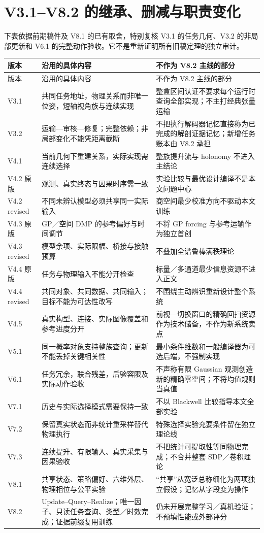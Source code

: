 \documentclass[UTF8,11pt,a4paper,fontset=fandol]{ctexart}
\numberwithin{equation}{section}
\theoremstyle{definition}
\begin{document}
\section{V3.1--V8.2 的继承、删减与职责变化}
\label{app:versions}
下表依据前期稿件及 V8.1 的已有取舍，特别复核 V3.1 的任务几何、V3.2 的非局部更新和 V6.1 的完整动作验收。它不是重新证明所有旧稿定理的独立审计。
\begin{longtable}{P{25mm}P{65mm}P{58mm}}
\toprule
版本 & 沿用的具体内容 & 不作为 V8.2 主线的部分\\\midrule\endfirsthead
\toprule 版本 & 沿用的具体内容 & 不作为 V8.2 主线的部分\\\midrule\endhead
V3.1 & 共同任务地址，物理关系而非唯一位姿，短轴视角族与连续实现 & 整盒区间认证不要求每个运行时查询全部实现；不主打经典张量运输\\
V3.2 & 运输—审核—修复；完整依赖；非局部变化不能凭距离截断 & 不把执行解码器记忆直接称为已完成的解剖证据记忆；新增任务账本由 V8.2 承担\\
V4.1 & 当前几何下重建关系，实际实现需连续选择 & 整族提升流与 holonomy 不进入主结论\\
V4.2 原版 & 观测、真实终态与因果时序需一致 & 实验比较与最优设计编译不是本文问题中心\\
V4.2 revised & 不同未辨认模型必须共享同一实际输入 & 商空间最少校准方向不驱动本文训练\\
V4.3 原版 & GP／空间 DMP 的参考偏好与时间调节 & 不将 GP forcing 与参考运输作为独立首创\\
V4.3 revised & 模型余项、实际限幅、桥接与接触预算 & 不叠加全谱鲁棒满秩理论\\
V4.4 原版 & 任务与物理输入不能分开检查 & 标量／多通道最少信息资源不进入正文\\
V4.4 revised & 共同对象、共同数据、共同输入；目标不能为可达性改写 & 不围绕主动辨识重新设计整个系统\\
V4.5 & 真实构型、连接、实际图像覆盖和参考进度分开 & 前视—切换窗口的精确回扫资源作为技术储备，不作为新系统卖点\\
V5.1 & 同一概率对象支持整族查询；更新不能丢掉关键相关性 & 最小条件维数和一般编译器为可选后端，不强制实现\\
V6.1 & 任务冗余，联合残差，后验容限及实际动作验收 & 不声称有限 Gaussian 观测创造新的精确零空间；不将均值规则当真值\\
V7.1 & 历史与实际选择模式需要保持一致 & 不以 Blackwell 比较指导本文全部实验\\
V7.2 & 保留真实状态而非统计重采样替代物理执行 & 特殊选择实验充要条件留在独立理论线\\
V7.3 & 连续提升、有限输入、真实采集与因果验收 & 不把统计可提取性等同物理完成；不合并整套 SDP／卷积理论\\
V8.1 & 共享状态、策略偏好、六维外层、物理相位与公平实验 & “共享”从宽泛总称细化为两项独立假设；记忆从字段变为操作\\
V8.2 & Update--Query--Realize；唯一因子、只读任务查询、类型／时效完成；证据前缀复用训练 & 仍未开展完整学习／真机验证；不预填性能或外部评分\\\bottomrule
\end{longtable}
\end{document}
